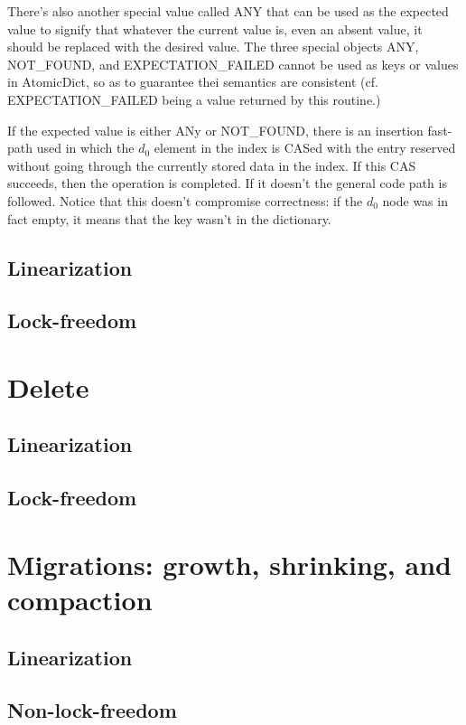 There's also another special value called ANY that can be used as the expected value to signify that whatever the current value is, even an absent value, it should be replaced with the desired value.
The three special objects ANY, NOT\_FOUND, and EXPECTATION\_FAILED cannot be used as keys or values in AtomicDict, so as to guarantee thei semantics are consistent (cf. EXPECTATION\_FAILED being a value returned by this routine.)

If the expected value is either ANy or NOT\_FOUND, there is an insertion fast-path used in which the $d_0$ element in the index is CASed with the entry reserved without going through the currently stored data in the index.
If this CAS succeeds, then the operation is completed.
If it doesn't the general code path is followed.
Notice that this doesn't compromise correctness: if the $d_0$ node was in fact empty, it means that the key wasn't in the dictionary.

\subsection{Linearization}
\subsection{Lock-freedom}

\section{Delete}
\subsection{Linearization}
\subsection{Lock-freedom}

\section{Migrations: growth, shrinking, and compaction}
\subsection{Linearization}
\subsection{Non-lock-freedom}

